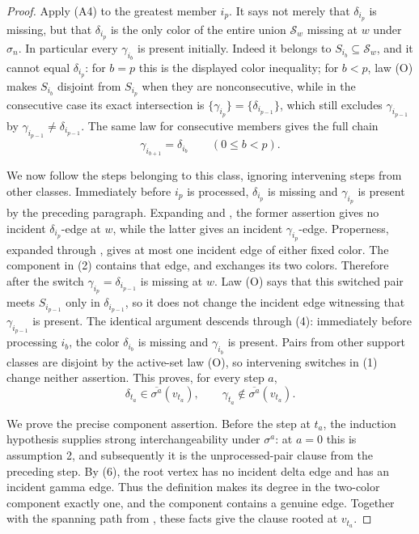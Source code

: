 \begin{proof}
Apply (A4) to the greatest member \(i_p\).  It says not merely that
\(\delta_{i_p}\) is missing, but that \(\delta_{i_p}\) is the only color
of the entire union \(\mathcal S_w\) missing at \(w\) under \(\sigma_n\).
In particular every \(\gamma_{i_b}\) is present initially.  Indeed it
belongs to \(S_{i_b}\subseteq\mathcal S_w\), and it cannot equal
\(\delta_{i_p}\): for \(b=p\) this is the displayed color inequality;
for \(b<p\), law (O) makes \(S_{i_b}\) disjoint from \(S_{i_p}\) when
they are nonconsecutive, while in the consecutive case its exact
intersection is \(\{\gamma_{i_p}\}=\{\delta_{i_{p-1}}\}\), which still
excludes \(\gamma_{i_{p-1}}\) by
\(\gamma_{i_{p-1}}\ne\delta_{i_{p-1}}\).  The same law for consecutive
members gives the full chain
\[
          \gamma_{i_{b+1}}=\delta_{i_b}\qquad(0\leq b<p).       \tag{5}
\]

We now follow the steps belonging to this class, ignoring intervening
steps from other classes.  Immediately before \(i_p\) is processed,
\(\delta_{i_p}\) is missing and \(\gamma_{i_p}\) is present by the
preceding paragraph.  Expanding  and
, the former assertion gives no incident
\(\delta_{i_p}\)-edge at \(w\), while the latter gives an incident
\(\gamma_{i_p}\)-edge.  Properness, expanded through
, gives at most one incident edge of either
fixed color.  The component in (2) contains that edge, and
 exchanges its two colors.  Therefore
after the switch \(\gamma_{i_p}=\delta_{i_{p-1}}\) is missing at \(w\).
Law (O) says that this switched pair meets \(S_{i_{p-1}}\) only in
\(\delta_{i_{p-1}}\), so it does not change the incident edge witnessing
that \(\gamma_{i_{p-1}}\) is present.  The identical argument descends
through (4): immediately before processing \(i_b\), the color
\(\delta_{i_b}\) is missing and \(\gamma_{i_b}\) is present.  Pairs from
other support classes are disjoint by the active-set law (O), so
intervening switches in (1) change neither assertion.  This proves, for
every step \(a\),
\[
 \delta_{t_a}\in\overline{\sigma^a}(v_{t_a}),\qquad
 \gamma_{t_a}\notin\overline{\sigma^a}(v_{t_a}).               \tag{6}
\]

We prove the precise component assertion.  Before the step at \(t_a\),
the induction hypothesis supplies strong interchangeability under
\(\sigma^a\): at \(a=0\) this is assumption 2, and subsequently it is the
unprocessed-pair clause from the preceding step.  By (6), the root
vertex has no incident delta edge and has an incident gamma edge.  Thus
the definition  makes its degree in the
two-color component exactly one, and the component contains a genuine
edge.  Together with the spanning path from
, these facts give the
 clause rooted at \(v_{t_a}\).


\end{proof}
